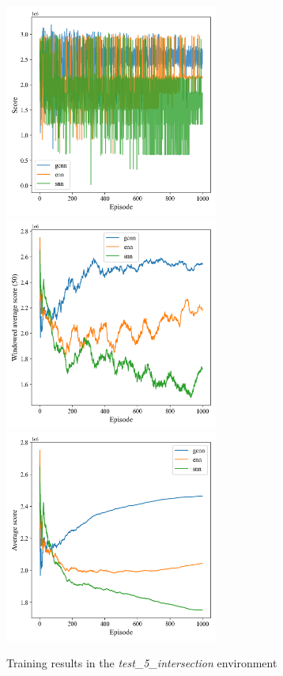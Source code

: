 \documentclass[
]{elteikthesis}[2023/04/10]
\begin{document}
\begin{figure}[H]
\begin{centering}
\includegraphics[width=7cm,height=7cm,keepaspectratio]{images/scores_history_comparison_test_5_intersection_empty}
\includegraphics[width=7cm,height=7cm,keepaspectratio]{images/windowed_scores_comparison_test_5_intersection_empty}\includegraphics[width=7cm,height=7cm,keepaspectratio]{images/average_scores_comparison_test_5_intersection_empty}
\par\end{centering}
\caption{Training results in the \emph{test\_5\_intersection} environment}
\end{figure}
\end{document}
